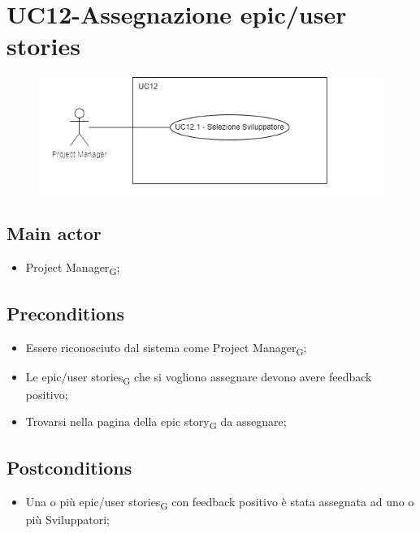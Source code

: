 \documentclass{article}
\begin{document}
\section{UC12-Assegnazione epic/user stories}
    \begin{figure}[h]
      \centering
      \includegraphics{./imgUML/UC12.png}
      \label{fig:immagine}
    \end{figure}

    \subsection*{Main actor}
    \begin{itemize}
        \item Project Manager\textsubscript{G};
    \end{itemize}
    
    \subsection*{Preconditions}
        \begin{itemize}
            \item Essere riconosciuto dal sistema come Project Manager\textsubscript{G};
            \item Le epic/user stories\textsubscript{G} che si vogliono assegnare devono avere feedback positivo;
            \item Trovarsi nella pagina della epic story\textsubscript{G} da assegnare;
        \end{itemize}
        
    \subsection*{Postconditions}
        \begin{itemize}
            \item Una o più epic/user stories\textsubscript{G} con feedback positivo è stata assegnata ad uno o più Sviluppatori;
        \end{itemize}
    
\end{document}
